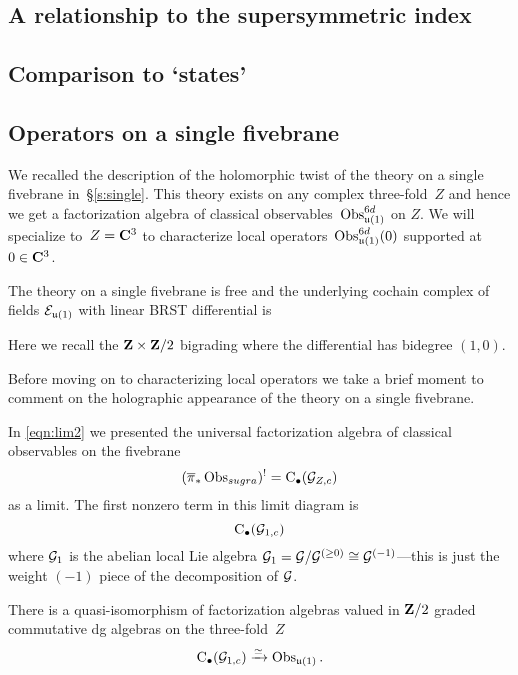\subsection{A relationship to the supersymmetric index}

\subsection{Comparison to `states'}

\subsection{Operators on a single fivebrane}

We recalled the description of the holomorphic twist of the theory on a single fivebrane in~\S\ref{s:single}. 
This theory exists on any complex three-fold~$Z$ and hence we get a factorization algebra of classical observables~$\operatorname{Obs}^{6d}_{\mathfrak{u}(1)}$ on $Z$.
We will specialize to~$Z=\mathbf{C}^3$ to characterize local operators~$\operatorname{Obs}^{6d}_{\mathfrak{u}(1)}(0)$ supported at~$0 \in \mathbf{C}^3$. 

The theory on a single fivebrane is free and the underlying cochain complex of fields $\mathcal E_{\mathfrak{u}(1)}$ with linear BRST differential is
\beqn
{} 
\eeqn
Here we recall the $\mathbf{Z} \times \mathbf{Z}/2$ bigrading where the differential has bidegree $(1,0)$. 

Before moving on to characterizing local operators we take a brief moment to comment on the holographic appearance of the theory on a single fivebrane. 

\parsec[s:fiverelatesingle]

In \eqref{eqn:lim2} we presented the universal factorization algebra of classical observables on the fivebrane 
\[
(\overline{\pi}_* \operatorname{Obs}_{sugra})^! = {\rm C}_\bullet(\mathcal G_{Z,c}) 
\]
as a limit.
The first nonzero term in this limit diagram is 
\[
{\rm C}_\bullet(\mathcal G_{1,c})
\]
where $\mathcal G_1$ is the abelian local Lie algebra $\mathcal G_{1} = \mathcal G / \mathcal G^{(\geq 0)} \cong \mathcal G^{(-1)}$---this is just the weight $(-1)$ piece of the decomposition of $\mathcal G$. 

\begin{prop}
There is a quasi-isomorphism of factorization algebras valued in $\mathbf{Z}/2$ graded commutative dg algebras on the three-fold~$Z$
\[
{\rm C}_\bullet(\mathcal G_{1,c}) \xrightarrow{\simeq} \operatorname{Obs}_{\mathfrak{u}(1)} .
\]
\end{prop}

